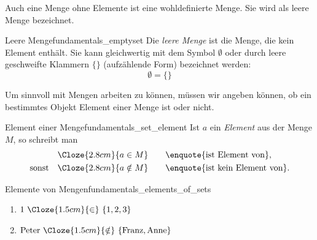 Auch eine Menge ohne Elemente ist eine wohldefinierte Menge. Sie wird als
leere Menge bezeichnet.

\begin{DefinitionBox}{Leere Menge}{fundamentals_emptyset}
  Die \emph{leere Menge}  ist die Menge, die kein
  Element enthält. Sie kann gleichwertig mit dem Symbol $\emptyset$ oder durch
  leere geschweifte Klammern $\{\}$ (aufzählende Form) bezeichnet werden:
  \[
    \emptyset=\{\}
  \]
\end{DefinitionBox}



\begin{minipage}{\linewidth}
Um sinnvoll mit Mengen arbeiten zu können, müssen wir angeben können, ob ein
bestimmtes Objekt Element einer Menge ist oder nicht.

\begin{DefinitionBox}{Element einer Menge}{fundamentals_set_element}
  Ist $a$ ein \emph{Element}  aus der Menge $M$, so
  schreibt man
  \begin{align*}
    &\Cloze{2.8cm}{a\in M}
    \qquad \text{\enquote{ist Element von}}, \\
    \text{sonst} \quad
    &\Cloze{2.8cm}{a\notin M}
    \qquad\text{\enquote{ist kein Element von}}.
  \end{align*}
\end{DefinitionBox}

\begin{ExampleBox}{Elemente von Mengen}{fundamentals_elements_of_sets}
  \begin{enumerate}[label=\alph*),itemsep=0.6em]
    \item $1\ \Cloze{1.5cm}{\in}\ \{1,2,3\}$
    \item $\text{Peter}\ \Cloze{1.5cm}{\notin}\
      \{\text{Franz},\text{Anne}\}$
  \end{enumerate}
\end{ExampleBox}
\end{minipage}





\clearpage


